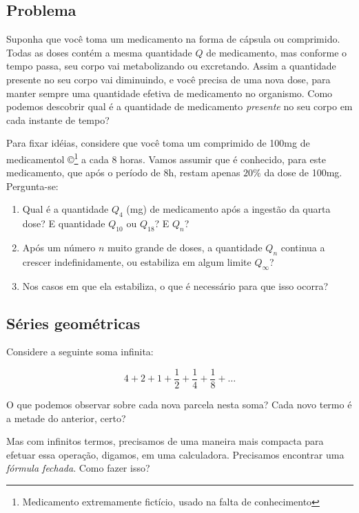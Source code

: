 \documentclass[a4paper]{article}
\begin{document}
\subsection{Problema}
\label{sec:problema}

Suponha que você toma um medicamento na forma de cápsula ou
comprimido. Todas as doses contém a mesma quantidade $Q$ de
medicamento, mas conforme o tempo passa, seu corpo vai metabolizando
ou excretando. Assim a quantidade presente no seu corpo vai
diminuindo, e você precisa de uma nova dose, para manter sempre uma
quantidade efetiva de medicamento no organismo. Como podemos descobrir
qual é a quantidade de medicamento {\em presente} no seu corpo em cada
instante de tempo?

Para fixar idéias, considere que você toma um comprimido de 100mg de
medicamentol \copyright\footnote{Medicamento extremamente fictício,
  usado na falta de conhecimento} a cada 8 horas. Vamos assumir que é
conhecido, para este medicamento, que após o período de 8h, restam
apenas $20\%$ da dose de 100mg. Pergunta-se:

\begin{enumerate}
\item Qual é a quantidade $Q_4$ (mg) de medicamento após a ingestão da
  quarta dose? E quantidade $Q_{10}$ ou $Q_{18}$? E $Q_n$?
\item Após um número $n$ muito grande de doses, a quantidade $Q_n$
  continua a crescer indefinidamente, ou estabiliza em algum limite
  $Q_\infty$?
\item Nos casos em que ela estabiliza, o que é necessário para que
  isso ocorra?
\end{enumerate}

\subsection{Séries geométricas}

Considere a seguinte soma infinita:

\begin{displaymath}
  4+ 2+ 1+ \frac{1}{2} +\frac{1}{4} + \frac{1}{8} + \ldots
\end{displaymath}

O que podemos observar sobre cada nova parcela nesta soma? Cada novo
termo é a metade do anterior, certo?

Mas com infinitos termos, precisamos de uma maneira mais compacta para
efetuar essa operação, digamos, em uma calculadora. Precisamos
encontrar uma {\em fórmula fechada}. Como fazer isso?
\end{document}
